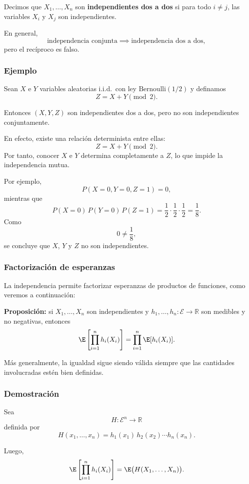 Decimos que $X_1,\dots,X_n$ son \textbf{independientes dos a dos} si para todo $i\neq j$, las variables $X_i$ y $X_j$ son independientes.

En general,
\[
\text{independencia conjunta} \implies \text{independencia dos a dos},
\]
pero el recíproco es falso.

\subsubsection*{Ejemplo}

Sean $X$ e $Y$ variables aleatorias i.i.d.\ con ley $\mathrm{Bernoulli}(1/2)$ y definamos
\[
Z = X+Y \pmod 2.
\]

Entonces $(X,Y,Z)$ son independientes dos a dos, pero no son independientes conjuntamente.

En efecto, existe una relación determinista entre ellas:
\[
Z = X+Y \pmod 2.
\]
Por tanto, conocer $X$ e $Y$ determina completamente a $Z$, lo que impide la independencia mutua.

Por ejemplo,
\[
P(X=0,Y=0,Z=1)=0,
\]
mientras que
\[
P(X=0)\,P(Y=0)\,P(Z=1)
=
\frac12\cdot\frac12\cdot\frac12
=
\frac18.
\]
Como
\[
0\neq \frac18,
\]
se concluye que $X$, $Y$ y $Z$ no son independientes.

\subsubsection*{Factorización de esperanzas}

La independencia permite factorizar esperanzas de productos de funciones, como veremos a continuación:

\textbf{Proposición:} si $X_1,\dots,X_n$ son independientes y $h_1,\dots,h_n:\mathcal{E}\to\mathbb{R}$ son medibles y no negativas, entonces
\[
\E\left[\prod_{i=1}^n h_i(X_i)\right]
=
\prod_{i=1}^n \E[h_i(X_i)].
\]

Más generalmente, la igualdad sigue siendo válida siempre que las cantidades involucradas estén bien definidas.

\medskip

\noindent
\subsubsection*{Demostración}

Sea
\[
H:\mathcal{E}^n \to \mathbb{R}
\]
definida por
\[
H(x_1,\dots,x_n)=h_1(x_1)\,h_2(x_2)\cdots h_n(x_n).
\]

Luego,
\[
\E\left[\prod_{i=1}^n h_i(X_i)\right]
=
\E\big(H(X_1,\dots,X_n)\big).
\]

